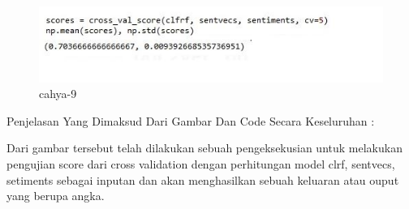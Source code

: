\begin{enumerate}
\begin{itemize}
\par
\begin{figure}[!hbtp]
\centering
\includegraphics[scale=0.3]{figures/cahya-9.jpg}
\caption{cahya-9}
\label{cahya-9}
\end{figure}
\par
\par Penjelasan Yang  Dimaksud Dari Gambar Dan Code Secara Keseluruhan : 
\par Dari gambar tersebut telah dilakukan sebuah pengeksekusian untuk melakukan pengujian score dari cross validation dengan  perhitungan model clrf, sentvecs, setiments sebagai inputan dan akan menghasilkan sebuah keluaran atau ouput yang berupa angka.
\par
\end{itemize}
\par


\end{enumerate}
